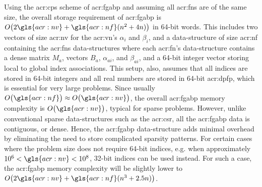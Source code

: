 Using the \gls{acr:cps} scheme of \gls{acr:fgabp} and assuming all \glspl{acr:fn} are of the same size, the overall storage requirement of \gls{acr:fgabp} is $\bigo{2 \gls{acr:nv}+\gls{acr:nf}(n^2+4n)}$ in 64-bit words.
This includes two vectors of size \gls{acr:nv} for the \gls{acr:vn}'s $\alpha_i$ and $\beta_i$, and a data-structure of size \gls{acr:nf} containing the \glspl{acr:fn} data-structures where each \gls{acr:fn}'s data-structure contains a dense matrix $M_a$, vectors $B_a$, $\alpha_{ai}$, and $\beta_{ai}$, and a 64-bit integer vector storing local to global index associations.
This setup, also, assumes that all indices are stored in 64-bit integers and all real numbers are stored in 64-bit \gls{acr:dpfp}, which is essential for very large problems.
Since usually $\bigo{\gls{acr:nf}}\approx \bigo{\gls{acr:nv}}$, the overall \gls{acr:fgabp} memory complexity is $\bigo{\gls{acr:nv}}$, typical for sparse problems.
However, unlike conventional sparse data-structures such as the \gls{acr:csr}, all the \gls{acr:fgabp} data is contiguous, or dense.
Hence, the \gls{acr:fgabp} data-structure adds minimal overhead by eliminating the need to store complicated sparsity patterns.
For certain cases where the problem size does not require 64-bit indices, e.g. when approximately $10^6<\gls{acr:nv}<10^8$, 32-bit indices can be used instead.
For such a case, the \gls{acr:fgabp} memory complexity will be slightly lower to $\bigo{2 \gls{acr:nv}+\gls{acr:nf}(n^3+2.5n)}$.


